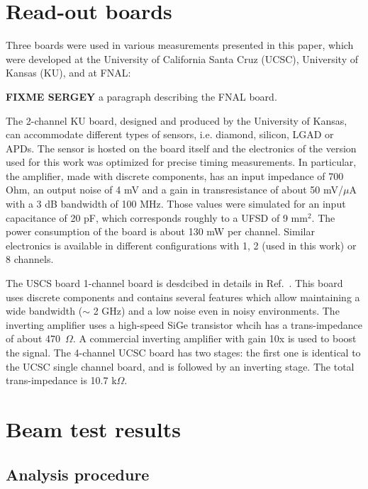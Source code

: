 \documentclass[preprint,1p]{elsarticle}
\begin{document}
\section{Read-out boards}

Three boards were used in various measurements presented in this paper, which
were developed at the University of California Santa Cruz (UCSC), University of
Kansas (KU), and at FNAL:

\textbf {FIXME SERGEY} a paragraph describing the FNAL board. 

The 2-channel KU board, designed and produced by the University of Kansas, can
accommodate different types of sensors, i.e. diamond, silicon, LGAD or APDs. The
sensor is hosted on the board itself and the electronics of the version used for
this work was optimized for precise timing measurements. In particular, the
amplifier, made with discrete components, has an input impedance of 700 Ohm, an
output noise of 4 mV and a gain in transresistance of about 50 mV/$\mu$A with
a 3 dB bandwidth of 100 MHz. Those values were simulated for an input
capacitance of 20 pF, which corresponds roughly to a UFSD of 9 mm$^2$. The power
consumption of the board is about 130 mW per channel. Similar electronics is
available in different configurations with 1, 2 (used in this work) or 8
channels.

The USCS board 1-channel board is desdcibed in details in
Ref.~\cite{Cartiglia201783}. This board uses discrete components and contains
several features which allow maintaining a wide bandwidth ($\sim$ 2 GHz) and a
low noise even in noisy environments. The inverting amplifier uses a high-speed
SiGe transistor whcih has a trans-impedance of about 470~$\Omega$. A commercial
inverting amplifier with gain 10x is used to boost the signal. The 4-channel
UCSC board has two stages: the first one is identical to the UCSC single channel
board, and is followed by an inverting stage. The total trans-impedance is 10.7
k$\Omega$.



\section{Beam test results}

\subsection{Analysis procedure}
\end{document}
